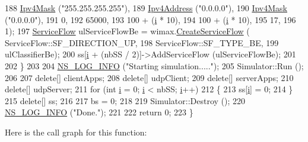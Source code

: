 \begin{DoxyCode}
188                                            \hyperlink{classns3_1_1Ipv4Mask}{Ipv4Mask} (\textcolor{stringliteral}{"255.255.255.255"}),
189                                            \hyperlink{classns3_1_1Ipv4Address}{Ipv4Address} (\textcolor{stringliteral}{"0.0.0.0"}),
190                                            \hyperlink{classns3_1_1Ipv4Mask}{Ipv4Mask} (\textcolor{stringliteral}{"0.0.0.0"}),
191                                            0,
192                                            65000,
193                                            100 + (\hyperlink{bernuolliDistribution_8m_a6f6ccfcf58b31cb6412107d9d5281426}{i} * 10),
194                                            100 + (\hyperlink{bernuolliDistribution_8m_a6f6ccfcf58b31cb6412107d9d5281426}{i} * 10),
195                                            17,
196                                            1);
197       \hyperlink{classns3_1_1ServiceFlow}{ServiceFlow} ulServiceFlowBe = wimax.\hyperlink{classns3_1_1WimaxHelper_aed0c1ffdcd62234c14965f899efc88c1}{CreateServiceFlow} (
      ServiceFlow::SF\_DIRECTION\_UP,
198                                                              ServiceFlow::SF\_TYPE\_BE,
199                                                              ulClassifierBe);
200       ss[\hyperlink{bernuolliDistribution_8m_a6f6ccfcf58b31cb6412107d9d5281426}{i} + (nbSS / 2)]->AddServiceFlow (ulServiceFlowBe);
201 
202     \}
203 
204   \hyperlink{group__logging_gafbd73ee2cf9f26b319f49086d8e860fb}{NS\_LOG\_INFO} (\textcolor{stringliteral}{"Starting simulation....."});
205   Simulator::Run ();
206 
207   \textcolor{keyword}{delete}[] clientApps;
208   \textcolor{keyword}{delete}[] udpClient;
209   \textcolor{keyword}{delete}[] serverApps;
210   \textcolor{keyword}{delete}[] udpServer;
211   \textcolor{keywordflow}{for} (\textcolor{keywordtype}{int} \hyperlink{bernuolliDistribution_8m_a6f6ccfcf58b31cb6412107d9d5281426}{i} = 0; \hyperlink{bernuolliDistribution_8m_a6f6ccfcf58b31cb6412107d9d5281426}{i} < nbSS; \hyperlink{bernuolliDistribution_8m_a6f6ccfcf58b31cb6412107d9d5281426}{i}++)
212     \{
213       ss[\hyperlink{bernuolliDistribution_8m_a6f6ccfcf58b31cb6412107d9d5281426}{i}] = 0;
214     \}
215   \textcolor{keyword}{delete}[] ss;
216 
217   bs = 0;
218 
219   Simulator::Destroy ();
220   \hyperlink{group__logging_gafbd73ee2cf9f26b319f49086d8e860fb}{NS\_LOG\_INFO} (\textcolor{stringliteral}{"Done."});
221 
222   \textcolor{keywordflow}{return} 0;
223 \}
\end{DoxyCode}


Here is the call graph for this function\+:


